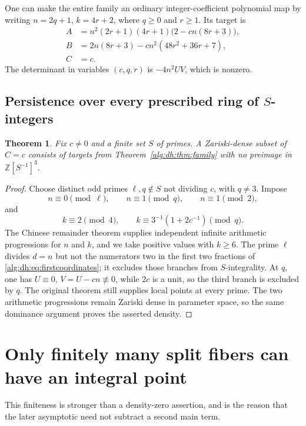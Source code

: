 \documentclass[11pt]{article}
\numberwithin{equation}{section}
\newtheorem{theorem}{Theorem}[section]
\theoremstyle{plain}
\theoremstyle{plain}
\theoremstyle{plain}
\theoremstyle{definition}
\theoremstyle{definition}
\theoremstyle{definition}
\theoremstyle{remark}
\newcommand{\Z}{\mathbb Z}\newcommand{\Q}{\mathbb Q}
\begin{document}
One can make the entire family an ordinary integer-coefficient polynomial
map by writing $n=2q+1$, $k=4r+2$, where $q\ge0$ and $r\ge1$. Its target is
\begin{equation}\label{alg:dh:eq:integer-polynomial-family}
\begin{split}
 A&=n^2(2r+1)(4r+1)\bigl(2-cn(8r+3)\bigr),\\
 B&=2n(8r+3)-cn^2(48r^2+36r+7),\\
 C&=c.
\end{split}
\end{equation}
The determinant in variables $(c,q,r)$ is $-4n^2UV$, which is nonzero.

\subsection{Persistence over every prescribed ring of \texorpdfstring{$S$}{S}-integers}
\begin{theorem}\label{alg:dh:thm:S}
Fix $c\ne0$ and a finite set $S$ of primes. A Zariski-dense subset of
$C=c$ consists of targets from Theorem~\ref{alg:dh:thm:family} with no preimage
in $\Z[S^{-1}]^3$.
\end{theorem}
\begin{proof}
Choose distinct odd primes $\ell,q\notin S$ not dividing $c$, with
$q\ne3$. Impose
\[
 n\equiv0\pmod\ell,\qquad n\equiv1\pmod q,\qquad n\equiv1\pmod2,
\]
and
\[
 k\equiv2\pmod4,\qquad
 k\equiv 3^{-1}(1+2c^{-1})\pmod q.
\]
The Chinese remainder theorem supplies independent infinite arithmetic
progressions for $n$ and $k$, and we take positive values with $k\ge6$.
The prime $\ell$ divides $d=n$ but not the numerators two in the first
two fractions of \eqref{alg:dh:eq:firstcoordinates}; it excludes those branches
from $S$-integrality. At $q$, one has $U\equiv0$, $V=U-cn\not\equiv0$,
while $2c$ is a unit, so the third branch is excluded by $q$.
The original theorem still supplies local points at every prime.
The two arithmetic progressions remain Zariski dense in parameter space,
so the same dominance argument proves the asserted density.
\end{proof}

\section{Only finitely many split fibers can have an integral point}\label{alg:dh:sec:finite}
This finiteness is stronger than a density-zero assertion, and is the
reason that the later asymptotic need not subtract a second main term.
\end{document}
